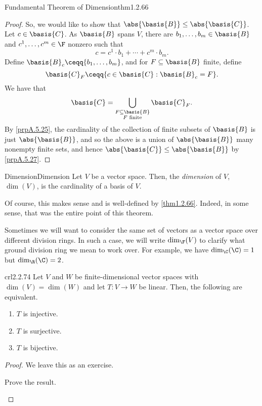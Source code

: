 \begin{thm}{Fundamental Theorem of Dimension}{thm1.2.66}
\begin{proof}
		So, we would like to show that $\abs{\basis{B}}\leq \abs{\basis{C}}$.  Let $c\in \basis{C}$.  As $\basis{B}$ spans $V$, there are $b_1,\ldots ,b_m\in \basis{B}$ and $c^1,\ldots ,c^m\in \F$ nonzero such that
		\begin{equation}
		c=c^1\cdot b_1+\cdots +c^m\cdot b_m.
		\end{equation}
		Define $\basis{B}_c\ceqq \{ b_1,\ldots ,b_m\}$, and for $F\subseteq \basis{B}$ finite, define
		\begin{equation}
		\basis{C}_F\ceqq \{ c\in \basis{C}:\basis{B}_c=F\} .
		\end{equation}
		We have that
		\begin{equation}
		\basis{C}=\bigcup _{\substack{F\subseteq \basis{B} \\ F\text{ finite}}}\basis{C}_F.
		\end{equation}
		By \cref{prpA.5.25}, the cardinality of the collection of finite subsets of $\basis{B}$ is just $\abs{\basis{B}}$, and so the above is a union of $\abs{\basis{B}}$ many nonempty finite sets, and hence $\abs{\basis{C}}\leq \abs{\basis{B}}$ by \cref{prpA.5.27}.
	\end{proof}
\end{thm}
\begin{dfn}{Dimension}{Dimension}
	Let $V$ be a vector space.  Then, the \emph{dimension} of $V$, $\dim (V)$, is the cardinality of a basis of $V$.
	\begin{rmk}
		Of course, this makes sense and is well-defined by \cref{thm1.2.66}.  Indeed, in some sense, that was the entire point of this theorem.
	\end{rmk}
	\begin{rmk}
		Sometimes we will want to consider the same set of vectors as a vector space over different division rings.  In such a case, we will write $\dim _{\F}(V)$ to clarify what ground division ring we mean to work over.  For example, we have $\dim _{\C}(\C )=1$ but $\dim _{\R}(\C )=2$.
	\end{rmk}
\end{dfn}
\begin{prp}{}{crl2.2.74}
	Let $V$ and $W$ be finite-dimensional vector spaces with $\dim (V)=\dim (W)$ and let $T\colon V\rightarrow W$ be linear.  Then, the following are equivalent.
	\begin{enumerate}
		\item $T$ is injective.
		\item $T$ is surjective.
		\item $T$ is bijective.
	\end{enumerate}
	\begin{proof}
		We leave this as an exercise.
		\begin{exr}[breakable=false]{}{}
			Prove the result.
		\end{exr}
	\end{proof}
\end{prp}

